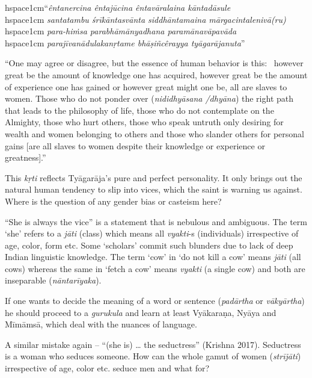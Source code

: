 \begin{enumerate}
\begin{myquote}
hspace{1cm}“\textit{êntanercina êntajūcina êntavāralaina kāntadāsule}\\hspace{1cm} \textit{santatambu śrīkāntasvānta siddhāntamaina mārgacintalenivā(ru)}\\hspace{1cm} \textit{para-hiṁsa parabhāmānyadhana paramānavāpavāda} \\hspace{1cm} \textit{parajīvanādulakanṛtame bhāṣiñcêrayya tyāgarājanuta}”
\end{myquote}

 “One may agree or disagree, but the essence of human behavior is this:  however great be the amount of knowledge one has acquired, however great be the amount of experience one has gained or however great might one be, all are slaves to women. Those who do not ponder over (\textit{nididhyāsana /dhyāna}) the right path that leads to the philosophy of life, those who do not contemplate on the Almighty, those who hurt others, those who speak untruth only desiring for wealth and women belonging to others and those who slander others for personal gains [are all slaves to women despite their knowledge or experience or greatness].”

 This \textit{kṛti} reflects Tyāgarāja’s pure and perfect personality. It only brings out the natural human tendency to slip into vices, which the saint is warning us against. Where is the question of any gender bias or casteism here?

\end{enumerate}

“She is always the vice” is a statement that is nebulous and ambiguous. The term ‘she’ refers to a \textit{jāti} (class) which means all \textit{vyakti}-s (individuals) irrespective of age, color, form etc. Some ‘scholars’ commit such blunders due to lack of deep Indian linguistic knowledge. The term ‘cow’ in ‘do not kill a cow’ means \textit{jāti} (all cows) whereas the same in ‘fetch a cow’ means \textit{vyakti} (a single cow) and both are inseparable (\textit{nāntarīyaka}). 

If one wants to decide the meaning of a word or sentence (\textit{padārtha} or \textit{vākyārtha}) he should proceed to a \textit{gurukula} and learn at least Vyākaraṇa, Nyāya and Mīmāmsā, which deal with the nuances of language. 

A similar mistake again – “(she is) … the seductress” (Krishna 2017). Seductress is a woman who seduces someone. How can the whole gamut of women (\textit{strījāti}) irrespective of age, color etc. seduce men and what for? 

